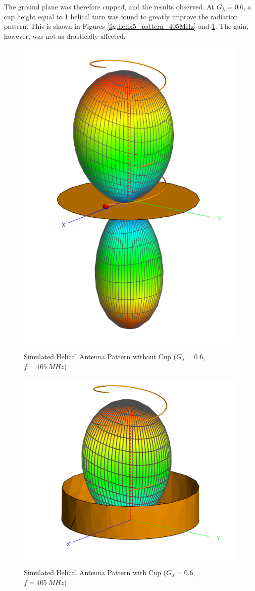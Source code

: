 The ground plane was therefore cupped, and the results observed. At $G_\lambda = 0.6$, a cup height equal to 1 helical turn was found to greatly improve the radiation pattern. This is shown in Figures \ref{fig:helix5_pattern_405MHz} and \ref{fig:helix6_pattern_405MHz}. The gain, however, was not as drastically affected.

\begin{figure}[!htb]
  \begin{minipage}{.49\textwidth}
    \centering
    \includegraphics[width=0.5\linewidth]{helix5_pattern_405MHz}
    \caption{Simulated Helical Antenna Pattern without Cup ($G_\lambda = 0.6$, $f=\SI{405}{MHz}$)}
    \label{fig:helix5_pattern_405MHz}
  \end{minipage}
  \begin{minipage}{.49\textwidth}
    \centering
    \includegraphics[width=0.85\linewidth]{helix6_pattern_405MHz}
    \caption{Simulated Helical Antenna Pattern with Cup ($G_\lambda = 0.6$, $f=\SI{405}{MHz}$)}
    \label{fig:helix6_pattern_405MHz}
  \end{minipage}
\end{figure}

